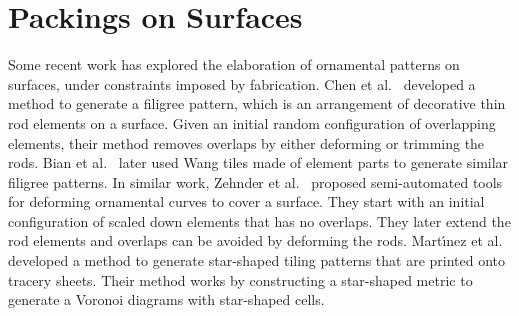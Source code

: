 \section{Packings on Surfaces}

Some recent work has explored the elaboration of ornamental
patterns on surfaces, under constraints imposed by fabrication.  
Chen et al.~\cite{Chen2016} developed a method to generate a filigree pattern,
which is an arrangement of decorative thin rod elements on a surface.
Given an initial random configuration of overlapping elements, their method
removes overlaps by either deforming or trimming the rods.
Bian et al.~\cite{Bian2018} later used Wang tiles made of element parts to generate similar filigree patterns.
In similar work, Zehnder et al.~\cite{Zehnder2016} 
proposed semi-automated tools for deforming ornamental curves to cover a surface. 
They start with an initial configuration of scaled down elements
that has no overlaps. They later extend the rod elements and 
overlaps can be avoided by deforming the rods.
Mart\'{\i}nez et al.~\cite{Martinez2019} developed a method to generate
star-shaped tiling patterns that are printed onto tracery sheets.
Their method works by constructing a star-shaped metric to generate a Voronoi diagrams with star-shaped cells. 




